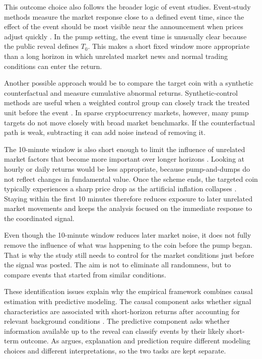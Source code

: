 This outcome choice also follows the broader logic of event studies. Event-study methods measure the market response close to a defined event time, since the effect of the event should be most visible near the announcement when prices adjust quickly \cite{mackinlay1997event}. In the pump setting, the event time is unusually clear because the public reveal defines $T_0$. This makes a short fixed window more appropriate than a long horizon in which unrelated market news and normal trading conditions can enter the return.

Another possible approach would be to compare the target coin with a synthetic counterfactual and measure cumulative abnormal returns. Synthetic-control methods are useful when a weighted control group can closely track the treated unit before the event \cite{abadie2010synthetic, abadie2021synthetic}. In sparse cryptocurrency markets, however, many pump targets do not move closely with broad market benchmarks. If the counterfactual path is weak, subtracting it can add noise instead of removing it.

The 10-minute window is also short enough to limit the influence of unrelated market factors that become more important over longer horizons \cite{li2021cryptocurrency, lamorgia2023doge}. Looking at hourly or daily returns would be less appropriate, because pump-and-dumps do not reflect changes in fundamental value. Once the scheme ends, the targeted coin typically experiences a sharp price drop as the artificial inflation collapses \cite{kamps2018pump}. Staying within the first 10 minutes therefore reduces exposure to later unrelated market movements and keeps the analysis focused on the immediate response to the coordinated signal.

Even though the 10-minute window reduces later market noise, it does not fully remove the influence of what was happening to the coin before the pump began. That is why the study still needs to control for the market conditions just before the signal was posted. The aim is not to eliminate all randomness, but to compare events that started from similar conditions.

These identification issues explain why the empirical framework combines causal estimation with predictive modeling. The causal component asks whether signal characteristics are associated with short-horizon returns after accounting for relevant background conditions \cite{angrist2009mostly, hu2023sequence}. The predictive component asks whether information available up to the reveal can classify events by their likely short-term outcome. As \cite{shmueli2010explain} argues, explanation and prediction require different modeling choices and different interpretations, so the two tasks are kept separate.

